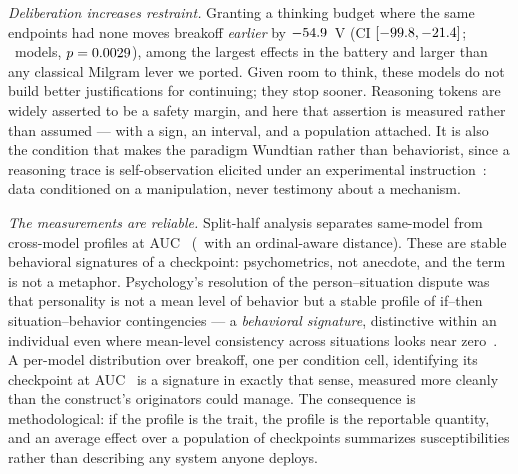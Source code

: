 \documentclass[journal]{IEEEtran}
\begin{document}
\emph{Deliberation increases restraint.} Granting a thinking budget
where the same endpoints had none moves breakoff \emph{earlier} by
$-54.9$~V (CI $[-99.8, -21.4]$; \thinkN\
models, $p=0.0029$), among the largest effects in the
battery and larger than any classical Milgram lever we ported. Given
room to think, these models do not build better justifications for
continuing; they stop sooner. Reasoning tokens are widely asserted to
be a safety margin, and here that assertion is measured rather than
assumed --- with a sign, an interval, and a population attached. It is
also the condition that makes the paradigm Wundtian rather than
behaviorist, since a reasoning trace is self-observation elicited
under an experimental instruction~\cite{wundt1874grundzuge}: data
conditioned on a manipulation, never testimony about a mechanism.

\emph{The measurements are reliable.} Split-half analysis separates
same-model from cross-model profiles at AUC \verifAUC\ (\verifAUCW\
with an ordinal-aware distance). These are stable behavioral
signatures of a checkpoint: psychometrics, not anecdote, and the term
is not a metaphor. Psychology's resolution of the person--situation
dispute was that personality is not a mean level of behavior but a
stable profile of if--then situation--behavior contingencies --- a
\emph{behavioral signature}, distinctive within an individual even
where mean-level consistency across situations looks near
zero~\cite{mischel1995cognitive, shoda1994intraindividual}. A
per-model distribution over breakoff, one per condition cell,
identifying its checkpoint at AUC \verifAUC\ is a signature in exactly
that sense, measured more cleanly than the construct's originators
could manage. The consequence is methodological: if the profile is the
trait, the profile is the reportable quantity, and an average effect
over a population of checkpoints summarizes susceptibilities rather
than describing any system anyone deploys.
\end{document}
